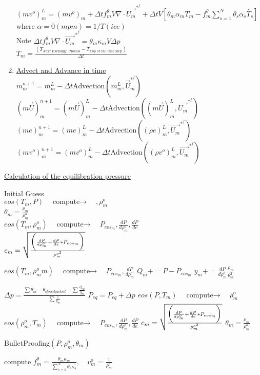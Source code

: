 \documentclass[fleqn]{article}
\newcommand{\SUM}[1]    {\ensuremath{\sum \limits_{{#1}=1}^N }}
\newcommand{\B}[1]      {\biggr{#1}}
\newcommand{\U}         {{\vec{U}}}
\newcommand{\rhoM}      {\ensuremath{\rho^{o}_m}}
\newcommand{\delt}      {\ensuremath{\Delta{t}} }
\newcommand{\f}         {\ensuremath{f^{\theta}_m} }
\newcommand{\sv}[1]     {\ensuremath{v^o_{m_{#1}} }}
\newcommand{\dpdrho}    {\ensuremath{ \frac{dP}{d\rhoM}} }
\newcommand{\compute}   {\ensuremath{\quad{\text{compute}\rightarrow}\quad}}
\begin{document}
\begin{enumerate}
\\
    $(mv^o)^L_m = (mv^o)_m + \delt \f V \nabla \cdot  \vec{U_m}^{*^{f}}
                + \delt V [\theta_m \alpha_m \dot{T_m} 
                - \f \SUM{s} {\theta_s \alpha_s \dot{T_s}}]  $ \quad where $\alpha = 0 (mpm) = 1/T (ice)$  \\
    Note $\delt \f V \nabla \cdot  \vec{U_m}^{*^{f}} = \theta_m \kappa_m V \Delta{p}$\\
   $\dot T_m =\frac{ (T_{\text{After Exchange Process}} - T_{\text{Top of the time step}})}{\delt} $
\item \underline{Advect and Advance in time}\\
$
    m^{n+1}_m     = m^L_m 
                  - \delt\text{Advection}(m^L_m, \U_ m^{*^{f}})$\\
$
    (m \U)^{n+1}_m = (m \U)^L_m 
                   - \delt\text{Advection}((m \U)^L_m, \vec{U_m}^{*^{f}})$\\
$
    (me)^{n+1}_m   = (me)^L_m       
                   - \delt\text{Advection}((\rho  e)^L_m, \vec{U_m}^{*^{f}})$ \\
$
    (mv^o)^{n+1}_m   = (mv^o)^L_m       
                   - \delt\text{Advection}((\rho  v^o)^L_m, \vec{U_m}^{*^{f}})
$

\end{enumerate}
\newpage
\underline{Calculation of the equilibration pressure}

\begin{algorithmic}
\STATE Initial Guess \\
  $eos(T_m, P)  \compute ,\rhoM$ \\
  $\theta_m = \frac{\rho_m}{\rhoM}$  \\
  $eos(T_m, \rhoM)  \compute P_{{eos}_m}, \dpdrho, \frac{dP}{de}$ \\ 
  $c_m =  \sqrt{ \frac {\B{(} \dpdrho + \frac{dP}{de} * P_{{eos}_m } \B{)}} {\rho^{o^2}_m} }$
%
    
      \STATE  $eos(T_m,\rhoM{m})  \compute P_{eos_{m}}, \dpdrho$
      \STATE $Q_m += P- P_{{eos}_m}$
      \STATE $y_m  += \dpdrho \frac{\rho_m}{\theta_m^2}$
    \ENDFOR

    \STATE $\Delta p = \frac{  \sum{\theta_m} - \theta_{closedpacked} - \sum{\frac{Q_m}{y_m}}  }{\sum{\frac{1}{y_m}} } $
    \STATE $P_{eq}=P_{eq}+ \Delta p $
%
      \STATE $ eos(P, T_m) \compute  \rhoM$ 
      \STATE $ eos(\rhoM, T_m) \compute   P_{{eos}_m}, \dpdrho, \frac{dP}{de}$ 
      \STATE $c_m = \sqrt{ \frac {\B{(}\dpdrho + \frac{dP}{de} * P_{{eos}_m } \B{)}} {\rho^{o^2}_m} }$
      \STATE $ \theta_m =  \frac{\rho_m}{\rhoM}$
    \ENDFOR

\ENDWHILE 
\STATE BulletProofing$(P, \rhoM, \theta_m) $

\STATE compute $  \f = \frac{\theta_m \kappa_m}{\SUM{s}{\theta_s \kappa_s}},  \quad\sv{} = \frac {1}{\rhoM}$
\end{algorithmic}
\end{document}
